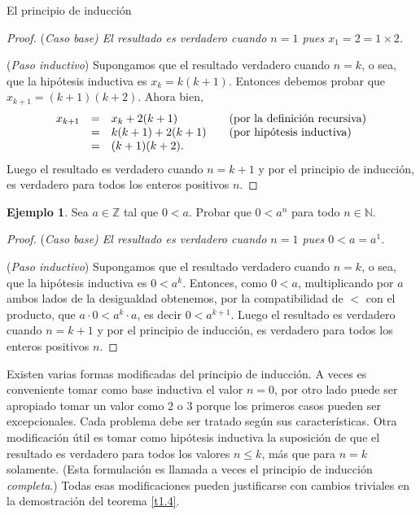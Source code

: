 \documentclass[11pt,spanish,makeidx]{amsbook}
\theoremstyle{definition}
\newtheorem{ejemplo}{Ejemplo}[section]
\theoremstyle{remark}
\begin{document}
\begin{section}{El principio de inducción}
\begin{proof}
\noindent(\it Caso  base\rm) El resultado es verdadero cuando $n=1$ pues $ x_1 = 2=1\times2$.

\noindent ({\it Paso  inductivo})  Supongamos que el resultado verdadero cuando $n=k$, o sea, que la hipótesis inductiva es $x_k = k(k+1)$. Entonces debemos probar  que $x_{k+1} = (k+1)(k+2)$. Ahora bien, 
\begin{equation*}
	\begin{matrix} 
	x_{k+1} &=& x_k + 2(k+1) \hfill &\quad \text{(por la definición recursiva)} \hfill \\
	&=& k(k+1)+2(k+1) \hfill &\quad \text{(por hipótesis inductiva)}\hfill \\
	&=& (k+1)(k+2). \hfill &
	\end{matrix}
\end{equation*}
Luego el resultado es verdadero cuando $n=k+1$ y por el principio de inducción, es verdadero para todos los enteros positivos $n$.
\end{proof}


\begin{ejemplo}\label{ejemplo141} Sea $a\in \mathbb Z$ tal que $0<a$. Probar que $0<a^n$ para todo $n \in \mathbb N$.
\end{ejemplo}
\begin{proof}
	
	\noindent(\it Caso  base\rm) El resultado es verdadero cuando $n=1$ pues $ 0 < a=a^1$.
	
	\noindent ({\it Paso  inductivo})  Supongamos que el resultado verdadero cuando $n=k$, o sea, que la hipótesis inductiva es $0 < a^k$. Entonces, como $0<a$, multiplicando por $a$ ambos lados de la desigualdad obtenemos, por la compatibilidad de $<$ con el producto, que $a\cdot 0 < a^k\cdot a$, es decir $0<a^{k+1}$. Luego el resultado es verdadero cuando $n=k+1$ y por el principio de inducción, es verdadero para todos los enteros positivos $n$.
\end{proof}


Existen varias formas modificadas del principio de inducción. A veces es conveniente tomar como base inductiva el valor $n=0$, por otro lado puede ser apropiado tomar un valor como $2$ o $3$ porque los primeros casos pueden ser excepcionales. Cada problema debe ser tratado según sus características. Otra modificación útil es tomar como hipótesis inductiva la suposición de que el resultado es verdadero para todos los valores $n\le k$, más que para $n=k$ solamente. (Esta formulación es llamada a veces el principio de inducción {\it completa}.) Todas esas modificaciones pueden justificarse con cambios triviales en la demostración del teorema \ref{t1.4}.


\end{section}
\end{document}
